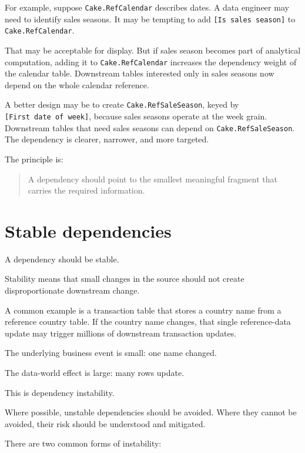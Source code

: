 \documentclass[10pt,openany,10pt]{book}
\begin{document}
For example, suppose \texttt{Cake.RefCalendar} describes dates. A data
engineer may need to identify sales seasons. It may be tempting to add
\texttt{{[}Is\ sales\ season{]}} to \texttt{Cake.RefCalendar}.

That may be acceptable for display. But if sales season becomes part of
analytical computation, adding it to \texttt{Cake.RefCalendar} increases
the dependency weight of the calendar table. Downstream tables
interested only in sales seasons now depend on the whole calendar
reference.

A better design may be to create \texttt{Cake.RefSaleSeason}, keyed by
\texttt{{[}First\ date\ of\ week{]}}, because sales seasons operate at
the week grain. Downstream tables that need sales seasons can depend on
\texttt{Cake.RefSaleSeason}. The dependency is clearer, narrower, and
more targeted.

The principle is:

\begin{quote}
A dependency should point to the smallest meaningful fragment that
carries the required information.
\end{quote}

\section{Stable dependencies}\label{stable-dependencies}

A dependency should be stable.

Stability means that small changes in the source should not create
disproportionate downstream change.

A common example is a transaction table that stores a country name from
a reference country table. If the country name changes, that single
reference-data update may trigger millions of downstream transaction
updates.

The underlying business event is small: one name changed.

The data-world effect is large: many rows update.

This is dependency instability.

Where possible, unstable dependencies should be avoided. Where they
cannot be avoided, their risk should be understood and mitigated.

There are two common forms of instability:
\end{document}
